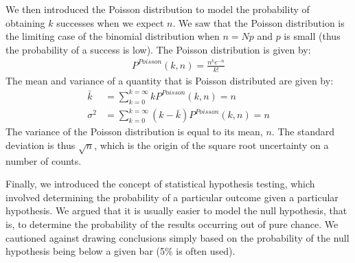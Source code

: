 We then introduced the Poisson distribution to model the probability of obtaining $k$ successes when we expect $n$. We saw that the Poisson distribution is the limiting case of the binomial distribution when $n=Np$ and $p$ is small (thus the probability of a success is low). The Poisson distribution is given by:
\begin{align*}
 P^{Poisson}(k,n)=\frac{n^k e^{-n}}{k!} 
\end{align*}  
The mean and variance of a quantity that is Poisson distributed are given by:
\begin{align}
\bar k &= \sum_{k=0}^{k=\infty}kP^{Poisson}(k,n)=n\\
\sigma^2 &= \sum_{k=0}^{k=\infty}(k-\bar k)P^{Poisson}(k,n)=n
\end{align}
The variance of the Poisson distribution is equal to its mean, $n$. The standard deviation is thus $\sqrt{n}$, which is the origin of the square root uncertainty on a number of counts.

Finally, we introduced the concept of statistical hypothesis testing, which involved determining the probability of a particular outcome given a particular hypothesis. We argued that it is usually easier to model the null hypothesis, that is, to determine the probability of the results occurring out of pure chance. We cautioned against drawing conclusions simply based on the probability of the null hypothesis being below a given bar (5\% is often used). 